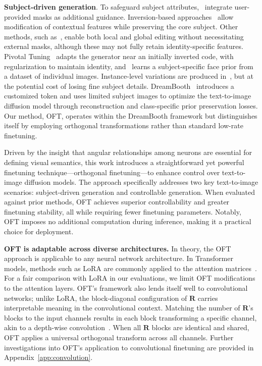 \begin{itemize}[leftmargin=*,nosep]
\textbf{Subject-driven generation}. To safeguard subject attributes,~\cite{avrahami2022blended,nichol2022glide} integrate user-provided masks as additional guidance. Inversion-based approaches~\cite{choi2021ilvr,dhariwal2021diffusion,ramesh2022hierarchical,gal2022image} allow modification of contextual features while preserving the core subject. Other methods, such as~\cite{hertz2022prompt}, enable both local and global editing without necessitating external masks, although these may not fully retain identity-specific features. Pivotal Tuning~\cite{roich2022pivotal} adapts the generator near an initially inverted code, with regularization to maintain identity, and~\cite{nitzan2022mystyle} learns a subject-specific face prior from a dataset of individual images. Instance-level variations are produced in~\cite{casanova2021instance}, but at the potential cost of losing fine subject details. DreamBooth~\cite{ruiz2023dreambooth} introduces a customized token and uses limited subject images to optimize the text-to-image diffusion model through reconstruction and class-specific prior preservation losses. Our method, OFT, operates within the DreamBooth framework but distinguishes itself by employing orthogonal transformations rather than standard low-rate finetuning.

Driven by the insight that angular relationships among neurons are essential for defining visual semantics, this work introduces a straightforward yet powerful finetuning technique—orthogonal finetuning—to enhance control over text-to-image diffusion models. The approach specifically addresses two key text-to-image scenarios: subject-driven generation and controllable generation. When evaluated against prior methods, OFT achieves superior controllability and greater finetuning stability, all while requiring fewer finetuning parameters. Notably, OFT imposes no additional computation during inference, making it a practical choice for deployment.

\textbf{OFT is adaptable across diverse architectures.} In theory, the OFT approach is applicable to any neural network architecture. In Transformer models, methods such as LoRA are commonly applied to the attention matrices~\cite{hulora2022}. For a fair comparison with LoRA in our evaluations, we limit OFT modifications to the attention layers. OFT's framework also lends itself well to convolutional networks; unlike LoRA, the block-diagonal configuration of $\bm{R}$ carries interpretable meaning in the convolutional context. Matching the number of $\bm{R}$'s blocks to the input channels results in each block transforming a specific channel, akin to a depth-wise convolution~\cite{chollet2017xception}. When all $\bm{R}$ blocks are identical and shared, OFT applies a universal orthogonal transform across all channels. Further investigations into OFT's application to convolutional finetuning are provided in Appendix~\ref{app:convolution}.


\end{itemize}
